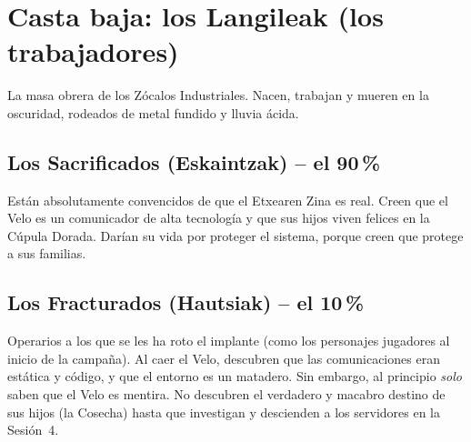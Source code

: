\section{Casta baja: los Langileak (los trabajadores)}

La masa obrera de los Zócalos Industriales. Nacen, trabajan y mueren en la oscuridad, rodeados de metal fundido y lluvia ácida.


\subsection{Los Sacrificados (Eskaintzak) -- el 90\,\%}

Están absolutamente convencidos de que el Etxearen Zina es real. Creen que el Velo es un comunicador de alta tecnología y que sus hijos viven felices en la Cúpula Dorada. Darían su vida por proteger el sistema, porque creen que protege a sus familias.

\subsection{Los Fracturados (Hautsiak) -- el 10\,\%}

Operarios a los que se les ha roto el implante (como los personajes jugadores al inicio de la campaña). Al caer el Velo, descubren que las comunicaciones eran estática y código, y que el entorno es un matadero. Sin embargo, al principio \emph{solo} saben que el Velo es mentira. No descubren el verdadero y macabro destino de sus hijos (la Cosecha) hasta que investigan y descienden a los servidores en la Sesión~4.
